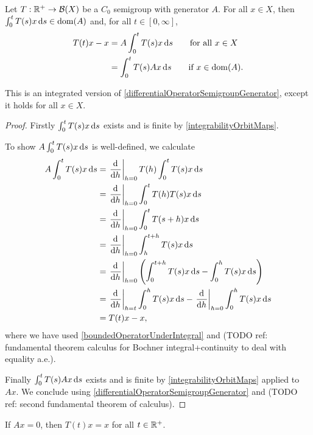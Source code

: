 \begin{proposition} \label{integralOperatorSemigroupGenerator}
Let $T: \mathbb{R}^{+}\to \operatorname{\mathcal{B}}(X)$ be a $C_0$ semigroup with generator $A$. For all $x\in X$, then $\int_0^t T(s)x\operatorname{d \!}{s}\in\operatorname{dom}(A)$ and, for all $t\in [0,\infty]$,
\begin{align*}
T(t)x - x &= A\int_0^t T(s)x\operatorname{d \!}{s} \qquad\text{for all $x\in X$} \\
&= \int_0^t T(s)Ax\operatorname{d \!}{s} \qquad\text{if $x\in\operatorname{dom}(A)$}.
\end{align*}
\end{proposition}
This is an integrated version of \ref{differentialOperatorSemigroupGenerator}, except it holds for all $x\in X$.
\begin{proof}
Firstly $\int_0^t T(s)x\operatorname{d \!}{s}$ exists and is finite by \ref{integrabilityOrbitMaps}.

To show $A\int_0^t T(s)x\operatorname{d \!}{s}$ is well-defined, we calculate
\begin{align*}
A\int_0^t T(s)x\diff{s} &= \left.\dod{}{h}\right|_{h=0}T(h)\int_0^t T(s)x\diff{s} \\
&= \left.\dod{}{h}\right|_{h=0}\int_0^t T(h)T(s)x\diff{s} \\
&= \left.\dod{}{h}\right|_{h=0}\int_0^t T(s+h)x\diff{s} \\
&= \left.\dod{}{h}\right|_{h=0}\int_h^{t+h} T(s)x\diff{s} \\
&= \left.\dod{}{h}\right|_{h=0}\left(\int_0^{t+h} T(s)x\diff{s}-\int_0^{h} T(s)x\diff{s}\right) \\
&= \left.\dod{}{h}\right|_{h=t}\int_0^{h} T(s)x\diff{s}-\left.\dod{}{h}\right|_{h=0}\int_0^{h} T(s)x\diff{s} \\
&= T(t)x - x,
\end{align*}
where we have used \ref{boundedOperatorUnderIntegral} and (TODO ref: fundamental theorem calculus for Bochner integral+continuity to deal with equality a.e.).

Finally $\int_0^t T(s)Ax\operatorname{d \!}{s}$ exists and is finite by \ref{integrabilityOrbitMaps} applied to $Ax$. We conclude using \ref{differentialOperatorSemigroupGenerator} and (TODO ref: second fundamental theorem of calculus).
\end{proof}
\begin{corollary} \label{kernelGeneratorInvariant}
If $Ax = 0$, then $T(t)x = x$ for all $t\in\mathbb{R}^{+}$.
\end{corollary}

